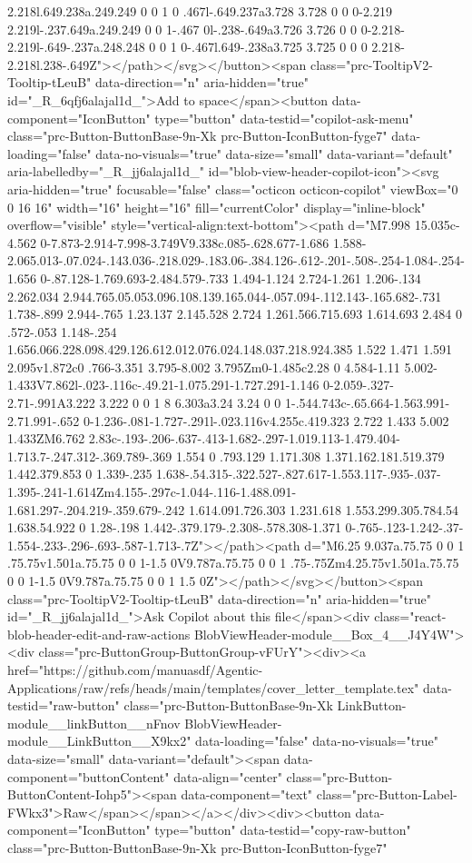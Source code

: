 {{{{{{{2.218l.649.238a.249.249 0 0 1 0 .467l-.649.237a3.728 3.728 0 0 0-2.219 2.219l-.237.649a.249.249 0 0 1-.467 0l-.238-.649a3.726 3.726 0 0 0-2.218-2.219l-.649-.237a.248.248 0 0 1 0-.467l.649-.238a3.725 3.725 0 0 0 2.218-2.218l.238-.649Z"></path></svg></button><span class="prc-TooltipV2-Tooltip-tLeuB" data-direction="n" aria-hidden="true" id="_R_6qfj6alajal1d_">Add to space</span><button data-component="IconButton" type="button" data-testid="copilot-ask-menu" class="prc-Button-ButtonBase-9n-Xk prc-Button-IconButton-fyge7" data-loading="false" data-no-visuals="true" data-size="small" data-variant="default" aria-labelledby="_R_jj6alajal1d_" id="blob-view-header-copilot-icon"><svg aria-hidden="true" focusable="false" class="octicon octicon-copilot" viewBox="0 0 16 16" width="16" height="16" fill="currentColor" display="inline-block" overflow="visible" style="vertical-align:text-bottom"><path d="M7.998 15.035c-4.562 0-7.873-2.914-7.998-3.749V9.338c.085-.628.677-1.686 1.588-2.065.013-.07.024-.143.036-.218.029-.183.06-.384.126-.612-.201-.508-.254-1.084-.254-1.656 0-.87.128-1.769.693-2.484.579-.733 1.494-1.124 2.724-1.261 1.206-.134 2.262.034 2.944.765.05.053.096.108.139.165.044-.057.094-.112.143-.165.682-.731 1.738-.899 2.944-.765 1.23.137 2.145.528 2.724 1.261.566.715.693 1.614.693 2.484 0 .572-.053 1.148-.254 1.656.066.228.098.429.126.612.012.076.024.148.037.218.924.385 1.522 1.471 1.591 2.095v1.872c0 .766-3.351 3.795-8.002 3.795Zm0-1.485c2.28 0 4.584-1.11 5.002-1.433V7.862l-.023-.116c-.49.21-1.075.291-1.727.291-1.146 0-2.059-.327-2.71-.991A3.222 3.222 0 0 1 8 6.303a3.24 3.24 0 0 1-.544.743c-.65.664-1.563.991-2.71.991-.652 0-1.236-.081-1.727-.291l-.023.116v4.255c.419.323 2.722 1.433 5.002 1.433ZM6.762 2.83c-.193-.206-.637-.413-1.682-.297-1.019.113-1.479.404-1.713.7-.247.312-.369.789-.369 1.554 0 .793.129 1.171.308 1.371.162.181.519.379 1.442.379.853 0 1.339-.235 1.638-.54.315-.322.527-.827.617-1.553.117-.935-.037-1.395-.241-1.614Zm4.155-.297c-1.044-.116-1.488.091-1.681.297-.204.219-.359.679-.242 1.614.091.726.303 1.231.618 1.553.299.305.784.54 1.638.54.922 0 1.28-.198 1.442-.379.179-.2.308-.578.308-1.371 0-.765-.123-1.242-.37-1.554-.233-.296-.693-.587-1.713-.7Z"></path><path d="M6.25 9.037a.75.75 0 0 1 .75.75v1.501a.75.75 0 0 1-1.5 0V9.787a.75.75 0 0 1 .75-.75Zm4.25.75v1.501a.75.75 0 0 1-1.5 0V9.787a.75.75 0 0 1 1.5 0Z"></path></svg></button><span class="prc-TooltipV2-Tooltip-tLeuB" data-direction="n" aria-hidden="true" id="_R_jj6alajal1d_">Ask Copilot about this file</span><div class="react-blob-header-edit-and-raw-actions BlobViewHeader-module__Box_4__J4Y4W"><div class="prc-ButtonGroup-ButtonGroup-vFUrY"><div><a href="https://github.com/manuasdf/Agentic-Applications/raw/refs/heads/main/templates/cover_letter_template.tex" data-testid="raw-button" class="prc-Button-ButtonBase-9n-Xk LinkButton-module__linkButton__nFnov BlobViewHeader-module__LinkButton__X9kx2" data-loading="false" data-no-visuals="true" data-size="small" data-variant="default"><span data-component="buttonContent" data-align="center" class="prc-Button-ButtonContent-Iohp5"><span data-component="text" class="prc-Button-Label-FWkx3">Raw</span></span></a></div><div><button data-component="IconButton" type="button" data-testid="copy-raw-button" class="prc-Button-ButtonBase-9n-Xk prc-Button-IconButton-fyge7" }}}}}}}
